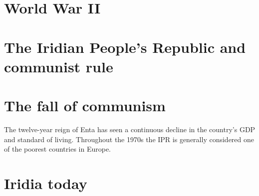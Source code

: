 \section{World War II}

\section{The Iridian People's Republic and communist rule}

\section{The fall of communism}

The twelve-year reign of Enta has seen a continuous decline in the country's GDP and standard of living. Throughout the 1970s the IPR is generally considered one of the poorest countries in Europe.

\section{Iridia today}





